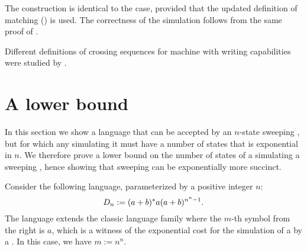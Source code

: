 The construction is identical to the \TDFA case, provided that the updated definition of matching () is used.
The correctness of the simulation follows from the same proof of .

Different definitions of crossing sequences for machine with writing capabilities were studied by \citeauthor{Hen65} \cite{Hen65}.



\section{A lower bound}\label{sec:sweplower}
In this section we show a language that can be accepted by an $n$-state sweeping \kDLA, but for which any \ONFA simulating it must have a number of states that is exponential in $n$.
We therefore prove a lower bound on the number of states of a \ONFA simulating a sweeping \kDLA, hence showing that sweeping \kDLAs can be exponentially more succinct.

Consider the following language, parameterized by a positive integer $n$:
\begin{equation*}
	D_n := (a+b)\star a (a+b)^{n^n-1} \text.
\end{equation*}
The language extends the classic language family where the $m$-th symbol from the right is $a$, which is a witness of the exponential cost for the simulation of a \TDFA by a \ODFA.
In this case, we have $m:=n^n$.


